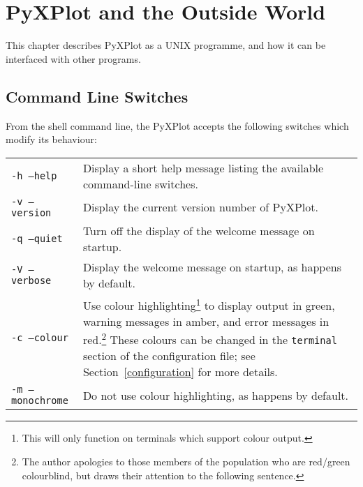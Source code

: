%
%
%
%
%



\chapter{PyXPlot and the Outside World}
\label{gnuplot_ext_first}

This chapter describes PyXPlot as a UNIX programme, and how it can be interfaced
with other programs. 

\section{Command Line Switches}

From the shell command line, the PyXPlot accepts the following switches which
modify its behaviour:

\begin{longtable}{p{3.5cm}p{8.5cm}}
{\tt -h --help} & Display a short help message listing the available command-line switches.\\
{\tt -v --version} & Display the current version number of PyXPlot.\\
{\tt -q --quiet} & Turn off the display of the welcome message on startup. \\
{\tt -V --verbose} & Display the welcome message on startup, as happens by default. \\
{\tt -c --colour} & Use colour highlighting\footnote{This will only function on terminals which support colour output.} to display output in green, warning messages in amber, and error messages in red.\footnote{The author apologies to those members of the population who are red/green colourblind, but draws their attention to the following sentence.} These colours can be changed in the {\tt terminal} section of the configuration file; see Section~\ref{configuration} for more details. \\
{\tt -m --monochrome} & Do not use colour highlighting, as happens by default. \\
\end{longtable}

